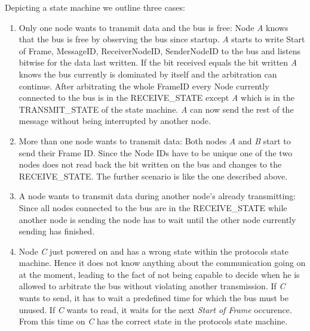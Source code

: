 Depicting a state machine we outline three cases:
\begin{enumerate}
 \item Only one node wants to transmit data and the bus is free: Node \textit{A} knows that the bus is free by 
observing the bus since startup. \textit{A} starts to write Start of Frame, MessageID, ReceiverNodeID, SenderNodeID  
to the bus and listens bitwise for the data last written.
       If the bit received equals the bit written \textit{A} knows the bus currently is dominated by itself and 
the arbitration can continue. After arbitrating the whole FrameID every Node currently connected to the bus is 
in the RECEIVE\_STATE except \textit{A} which is in the TRANSMIT\_STATE of the state machine.
       \textit{A} can now send the rest of the message without being interrupted by another node.

 \item More than one node wants to transmit data: Both nodes \textit{A} and \textit{B} start to send 
their Frame ID. Since the Node IDs have to be unique one of the two nodes does not read back the bit written on the bus and changes to the RECEIVE\_STATE. The further scenario is like the one described above.

 \item A node wants to transmit data during another node's already transmitting: Since all nodes connected to the bus are in the RECEIVE\_STATE while another node is sending the node has to wait until the other node currently sending has finished.

 \item Node \textit{C} just powered on and has a wrong state within the protocols state machine. Hence it does not know anything about the communication going on at the moment, leading to the fact of not being capable to decide when he is allowed to arbitrate the bus without violating another transmission.
       If \textit{C} wants to send, it has to wait a predefined time for which the bus must be unused. 
If \textit{C} wants to read, it waits for the next \textit{Start of Frame} occurence. From this time on \textit{C} has the correct state in the protocols state machine.
\end{enumerate}


